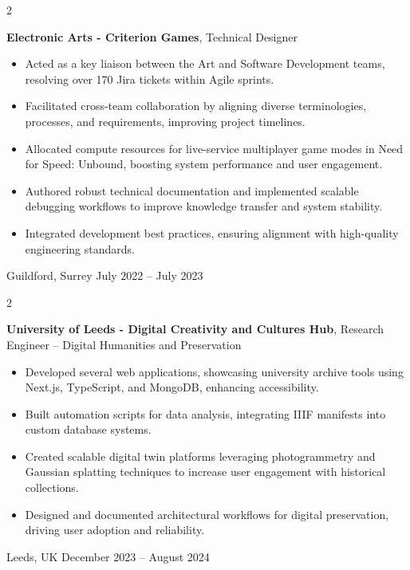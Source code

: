 \documentclass[10pt, letterpaper]{article}
\newenvironment{twocolentry}[2][]{
\onecolentry
\def\secondColumn{#2}
\setcolumnwidth{\fill, 4.5 cm}
\begin{paracol}{2}
}{
\switchcolumn \raggedleft \secondColumn
\end{paracol}
\endonecolentry
} %
\begin{document}
\begin{twocolentry}{
Guildford, Surrey
July 2022 – July 2023
}
\textbf{Electronic Arts - Criterion Games}, Technical Designer
\begin{itemize}

\item Acted as a key liaison between the Art and Software Development teams, resolving over 170 Jira tickets within Agile sprints. 
\item Facilitated cross-team collaboration by aligning diverse terminologies, processes, and requirements, improving project timelines. 
\item Allocated compute resources for live-service multiplayer game modes in Need for Speed: Unbound, boosting system performance and user engagement. 
\item Authored robust technical documentation and implemented scalable debugging workflows to improve knowledge transfer and system stability. 
\item Integrated development best practices, ensuring alignment with high-quality engineering standards. 
\end{itemize}



\end{twocolentry}
\vspace{0.2 cm}

\begin{twocolentry}{
Leeds, UK
December 2023 – August 2024
}
\textbf{University of Leeds - Digital Creativity and Cultures Hub}, Research Engineer – Digital Humanities and Preservation
\begin{itemize}

\item Developed several web applications, showcasing university archive tools using Next.js, TypeScript, and MongoDB, enhancing accessibility. 
\item Built automation scripts for data analysis, integrating IIIF manifests into custom database systems. 
\item Created scalable digital twin platforms leveraging photogrammetry and Gaussian splatting techniques to increase user engagement with historical collections. 
\item Designed and documented architectural workflows for digital preservation, driving user adoption and reliability. 
\end{itemize}



\end{twocolentry}
\medskip
\end{document}
